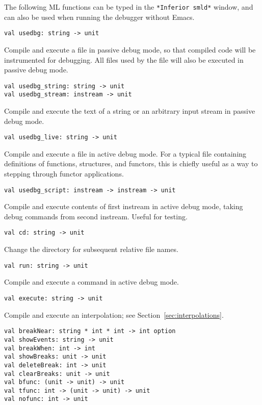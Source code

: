 The following ML functions can be typed in the \verb'*Inferior smld*'
window, and can also be used when running the debugger without Emacs. 

\begin{verbatim}
val usedbg: string -> unit
\end{verbatim}

Compile and execute a file in passive debug mode, so that compiled
code will be instrumented for debugging.  All files used by
the file will also be executed in passive debug mode.

\begin{verbatim}
val usedbg_string: string -> unit
val usedbg_stream: instream -> unit
\end{verbatim}

Compile and execute the text of a string or an arbitrary 
input stream in passive debug mode.

\begin{verbatim}
val usedbg_live: string -> unit
\end{verbatim}

Compile and execute a file in active debug mode.  For a typical file
containing definitions of functions, structures, and functors, this
is chiefly useful as a way to stepping through functor applications.

\begin{verbatim}
val usedbg_script: instream -> instream -> unit
\end{verbatim}

Compile and execute contents of first instream in active debug mode,
taking debug commands from second instream.  Useful for testing.

\begin{verbatim}
val cd: string -> unit
\end{verbatim}

Change the directory for subsequent relative file names.

\begin{verbatim}
val run: string -> unit
\end{verbatim}

Compile and execute a command in active debug mode.

\begin{verbatim}
val execute: string -> unit
\end{verbatim}

Compile and execute an interpolation; see Section~\ref{sec:interpolations}.

\begin{verbatim}
val breakNear: string * int * int -> int option
val showEvents: string -> unit
val breakWhen: int -> int
val showBreaks: unit -> unit
val deleteBreak: int -> unit
val clearBreaks: unit -> unit
val bfunc: (unit -> unit) -> unit
val tfunc: int -> (unit -> unit) -> unit
val nofunc: int -> unit
\end{verbatim}

